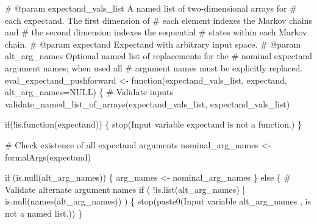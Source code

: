 \documentclass[
  letterpaper,
  DIV=11,
  numbers=noendperiod]{scrartcl}
\newenvironment{Shaded}{\begin{snugshade}}{\end{snugshade}}
\newcommand{\BuiltInTok}[1]{\textcolor[rgb]{0.00,0.23,0.31}{#1}}
\newcommand{\CommentTok}[1]{\textcolor[rgb]{0.37,0.37,0.37}{#1}}
\newcommand{\ControlFlowTok}[1]{\textcolor[rgb]{0.00,0.23,0.31}{#1}}
\newcommand{\KeywordTok}[1]{\textcolor[rgb]{0.00,0.23,0.31}{#1}}
\newcommand{\NormalTok}[1]{\textcolor[rgb]{0.00,0.23,0.31}{#1}}
\newcommand{\OperatorTok}[1]{\textcolor[rgb]{0.37,0.37,0.37}{#1}}
\newcommand{\StringTok}[1]{\textcolor[rgb]{0.13,0.47,0.30}{#1}}
\begin{document}
\begin{Shaded}
\begin{Highlighting}[]
\CommentTok{\# @param expectand\_vals\_list A named list of two{-}dimensional arrays for}
\CommentTok{\#                            each expectand.  The first dimension of}
\CommentTok{\#                            each element indexes the Markov chains and}
\CommentTok{\#                            the second dimension indexes the sequential}
\CommentTok{\#                            states within each Markov chain.}
\CommentTok{\# @param expectand Expectand with arbitrary input space.}
\CommentTok{\# @param alt\_arg\_names Optional named list of replacements for the}
\CommentTok{\#                      nominal expectand argument names; when used all}
\CommentTok{\#                      argument names must be explicitly replaced.}
\NormalTok{eval\_expectand\_pushforward }\OperatorTok{\textless{}{-}}\NormalTok{ function(expectand\_vals\_list,}
\NormalTok{                                       expectand,}
\NormalTok{                                       alt\_arg\_names}\OperatorTok{=}\NormalTok{NULL) \{}
  \CommentTok{\# Validate inputs}
\NormalTok{  validate\_named\_list\_of\_arrays(expectand\_vals\_list,}
                                \StringTok{\textquotesingle{}expectand\_vals\_list\textquotesingle{}}\NormalTok{)}

  \ControlFlowTok{if}\NormalTok{(}\OperatorTok{!}\KeywordTok{is}\NormalTok{.function(expectand)) \{}
\NormalTok{    stop(}\StringTok{\textquotesingle{}Input variable \textasciigrave{}expectand\textasciigrave{} is not a function.\textquotesingle{}}\NormalTok{)}
\NormalTok{  \}}

  \CommentTok{\# Check existence of all expectand arguments}
\NormalTok{  nominal\_arg\_names }\OperatorTok{\textless{}{-}}\NormalTok{ formalArgs(expectand)}

  \ControlFlowTok{if}\NormalTok{ (}\KeywordTok{is}\NormalTok{.null(alt\_arg\_names)) \{}
\NormalTok{    arg\_names }\OperatorTok{\textless{}{-}}\NormalTok{ nominal\_arg\_names}
\NormalTok{  \} }\ControlFlowTok{else}\NormalTok{ \{}
    \CommentTok{\# Validate alternate argument names}
    \ControlFlowTok{if}\NormalTok{ ( }\OperatorTok{!}\KeywordTok{is}\NormalTok{.}\BuiltInTok{list}\NormalTok{(alt\_arg\_names) }\OperatorTok{|}
          \KeywordTok{is}\NormalTok{.null(names(alt\_arg\_names)) ) \{}
\NormalTok{      stop(paste0(}\StringTok{\textquotesingle{}Input variable \textasciigrave{}alt\_arg\_names\textasciigrave{} \textquotesingle{}}\NormalTok{,}
                  \StringTok{\textquotesingle{}is not a named list.\textquotesingle{}}\NormalTok{))}
\NormalTok{    \}}


\end{Highlighting}
\end{Shaded}
\end{document}
